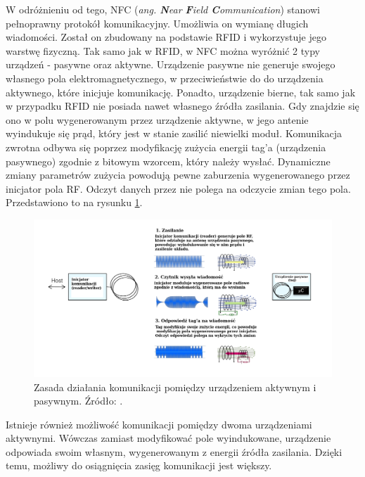 W odróżnieniu od tego, NFC (\textit{ang. \textbf{N}ear \textbf{F}ield \textbf{C}ommunication}) stanowi pełnoprawny protokół komunikacyjny. Umożliwia on wymianę długich wiadomości. Został on zbudowany na podstawie RFID i wykorzystuje jego warstwę fizyczną. Tak samo jak w RFID, w NFC można wyróżnić 2 typy urządzeń - pasywne oraz aktywne. Urządzenie pasywne nie generuje swojego własnego pola elektromagnetycznego, w przeciwieństwie do do urządzenia aktywnego, które inicjuje komunikację. Ponadto, urządzenie bierne, tak samo jak w przypadku RFID nie posiada nawet własnego źródła zasilania. Gdy znajdzie się ono w polu wygenerowanym przez urządzenie aktywne, w jego antenie wyindukuje się prąd, który jest w stanie zasilić niewielki moduł. Komunikacja zwrotna odbywa się poprzez modyfikację zużycia energii tag'a (urządzenia pasywnego) zgodnie z bitowym wzorcem, który należy wysłać. Dynamiczne zmiany parametrów zużycia powodują pewne zaburzenia wygenerowanego przez inicjator pola RF. Odczyt danych przez nie polega na odczycie zmian tego pola. Przedstawiono to na rysunku \ref{fig:image_nfc_comm}. 

\begin{figure}[H]
	\centering
	\includegraphics[width=18cm]{img/theory/NFC/NFC_communication.png}
	\caption{Zasada działania komunikacji pomiędzy urządzeniem aktywnym i pasywnym. Źródło: \cite{NFC_NXP}.}
	\label{fig:image_nfc_comm}
\end{figure}

Istnieje również możliwość komunikacji pomiędzy dwoma urządzeniami aktywnymi. Wówczas zamiast modyfikować pole wyindukowane, urządzenie odpowiada swoim własnym, wygenerowanym z energii źródła zasilania. Dzięki temu, możliwy do osiągnięcia zasięg komunikacji jest większy. 

